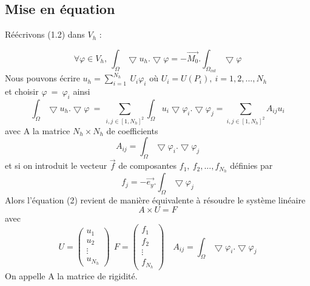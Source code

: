 \documentclass[a4paper,12pt,titlepage]{report}
\begin{document}
\begin{onehalfspace}
\subsection{Mise en équation}


Réécrivons (1.2) dans $V_{h}$ : 

\[
	\forall \varphi \in V_{h} , \ \int_{\Omega}\bigtriangledown u_{h}. \bigtriangledown \varphi = -\vec{M_{0}}. \int_{\Omega_{int}}\bigtriangledown \varphi
\]
Nous pouvons écrire $u_{h} = \sum_{i=1}^{N_{h}}{\ U_{i}\varphi_{i}} \text{ \ \ où } U_{i} = U(P_{i}),\  i= 1,2,...,N_{h}$ \\ et choisir $\varphi\ =\ \varphi_{i}$
ainsi
\[
	\int_{\Omega}\bigtriangledown u_{h}.\bigtriangledown \varphi\ 
	=\ 
	\sum_{i, j \in [1, N_{h}]^{2}} \int_{\Omega}u_{i}\bigtriangledown\varphi_{i}. \bigtriangledown\varphi_{j} 
	= 
	\sum_{i,j \in [1, N_{h}]^{2}} A_{ij} u_{i}
\]
avec A la matrice $N_{h} \times N_{h}$ de coefficients
\[
A_{ij}  = \int_{\Omega}\bigtriangledown\varphi_{i}.\bigtriangledown\varphi_{j}
\]
et si on introduit le vecteur $\vec{f}$ de composantes $f_{1},\ f_{2},..., f_{N_{h}}$ définies par
\[
f_{j} =  -\vec{e_{y}}.\int_{\Omega} \bigtriangledown\varphi_{j}
\]
Alors l'équation (2) revient de manière équivalente à résoudre le système linéaire 
\[
	A \times U =F
\]
 avec 
\[
U = 
\begin{pmatrix}
   u_{1} \\
   u_{2} \\
   \vdots \\
   u_{N_{h}}
\end{pmatrix}
\ \ F = 
\begin{pmatrix}
   f_{1} \\
   f_{2} \\
   \vdots \\
   f_{N_{h}}
\end{pmatrix}
\quad
A_{ij}  = \int_{\Omega}\bigtriangledown \varphi_{i}. \bigtriangledown \varphi_{j}
\]
On appelle A la matrice de rigidité.  \\

\newpage

\end{onehalfspace}
\end{document}
